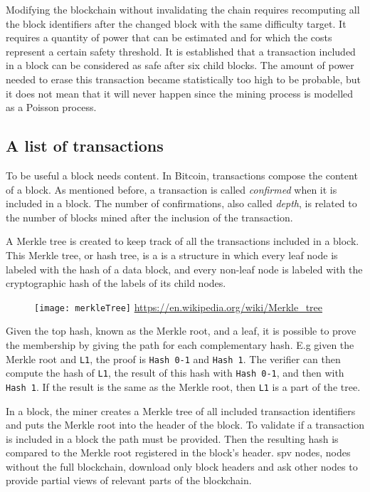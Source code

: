 Modifying the blockchain without invalidating the chain requires recomputing all
the block identifiers after the changed block with the same difficulty target. It requires a quantity of power
that can be estimated and for which the costs represent a certain safety
threshold. It is established that a transaction included in a block can be
considered as safe after six child blocks. The amount of power needed to erase
this transaction became statistically too high to be probable, but it does not
mean that it will never happen since the mining process is modelled as a Poisson
process.

\subsection{A list of transactions}

To be useful a block needs content. In Bitcoin, transactions compose the
content of a block. As mentioned before, a transaction is called
\textit{confirmed} when it is included in a block. The number of confirmations,
also called \textit{depth}, is related to the number of blocks mined after the
inclusion of the transaction.

A Merkle tree is created to keep track of all the transactions included in a
block. This Merkle tree, or hash tree, is a is a structure in which every leaf
node is labeled with the hash of a data block, and every non-leaf node is
labeled with the cryptographic hash of the labels of its child nodes.

\begin{figure}[H]
	\centering
	\texttt{[image: merkleTree]}
	{\url{https://en.wikipedia.org/wiki/Merkle_tree}}
	\label{fig:merkleTree}
\end{figure}

Given the top hash, known as the Merkle root, and a leaf, it is possible to prove the
membership by giving the path for each complementary hash. E.g given the
Merkle root and \texttt{L1}, the proof is \texttt{Hash 0-1} and \texttt{Hash 1}.
The verifier can then compute the hash of \texttt{L1}, the result of this hash
with \texttt{Hash 0-1}, and then with \texttt{Hash 1}. If the result is the same
as the Merkle root, then \texttt{L1} is a part of the tree.

In a block, the miner creates a Merkle tree of all included transaction
identifiers and puts the Merkle root into the header of the block. To validate
if a transaction is included in a block the path must be provided. Then the
resulting hash is compared to the Merkle root registered in the block's header.
\gls{spv} nodes, nodes without the full blockchain, download only block headers
and ask other nodes to provide partial views of relevant parts of the blockchain.

